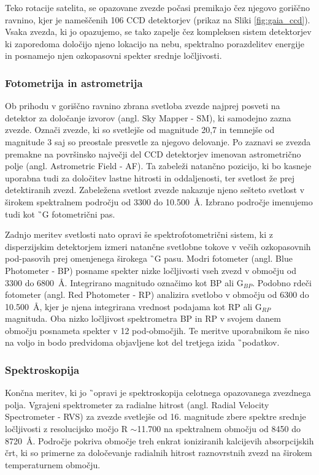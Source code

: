Teko rotacije satelita, se opazovane zvezde počasi premikajo čez njegovo goriščno ravnino, kjer je nameščenih 106 CCD detektorjev (prikaz na Sliki \ref{fig:gaia_ccd}). Vsaka zvezda, ki jo opazujemo, se tako zapelje čez kompleksen sistem detektorjev ki zaporedoma določijo njeno lokacijo na nebu, spektralno porazdelitev energije in posnamejo njen ozkopasovni spekter srednje ločljivosti.

\subsubsection{Fotometrija in astrometrija}
Ob prihodu v goriščno ravnino zbrana svetloba zvezde najprej posveti na detektor za določanje izvorov (angl. Sky Mapper - SM), ki samodejno zazna zvezde. Označi zvezde, ki so svetlejše od magnitude 20,7 in temnejše od magnitude 3 saj so preostale presvetle za njegovo delovanje. Po zaznavi se zvezda premakne na površinsko največji del CCD detektorjev imenovan astrometrično polje (angl. Astrometric Field - AF). Ta zabeleži natančno pozicijo, ki bo kasneje uporabna tudi za določitev lastne hitrosti in oddaljenosti, ter svetlost že prej detektiranih zvezd. Zabeležena svetlost zvezde nakazuje njeno sešteto svetlost v širokem spektralnem področju od 3300 do 10.500~\AA. Izbrano področje imenujemo tudi kot \G\ G fotometrični pas.

Zadnjo meritev svetlosti nato opravi še spektrofotometrični sistem, ki z disperzijskim detektorjem izmeri natančne svetlobne tokove v večih ozkopasovnih pod-pasovih prej omenjenega širokega \G\ G pasu. Modri fotometer (angl. Blue Photometer - BP) posname spekter nizke ločljivosti vseh zvezd v območju od 3300 do 6800~\AA. Integrirano magnitudo označimo kot BP ali G$_{BP}$. Podobno rdeči fotometer (angl. Red Photometer - RP) analizira svetlobo v območju od 6300 do 10.500~\AA, kjer je njena integrirana vrednost podajama kot RP ali G$_{RP}$ magnituda. Oba nizko ločljivost spektrometra BP in RP v svojem danem območju posnameta spekter v 12 pod-območjih. Te meritve uporabnikom še niso na voljo in bodo predvidoma objavljene kot del tretjega izida \G\ podatkov.

\subsubsection{Spektroskopija}
Končna meritev, ki jo \G\ opravi je spektroskopija celotnega opazovanega zvezdnega polja. Vgrajeni spektrometer za radialne hitrost (angl. Radial Velocity Spectrometer - RVS) za zvezde svetlejše od 16. magnitude zbere spektre srednje ločljivosti z resolucijsko močjo R $\sim$11.700 na spektralnem območju od 8450 do 8720~\AA. Področje pokriva območje treh enkrat ioniziranih kalcijevih absorpcijskih črt, ki so primerne za določevanje radialnih hitrost raznovrstnih zvezd na širokem temperaturnem območju.

